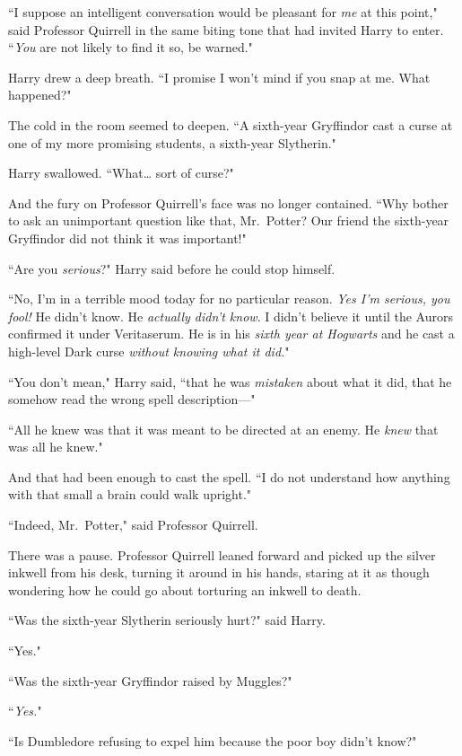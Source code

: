 ``I suppose an intelligent conversation would be pleasant for \emph{me} at this point," said Professor Quirrell in the same biting tone that had invited Harry to enter. ``\emph{You} are not likely to find it so, be warned."

Harry drew a deep breath. ``I promise I won't mind if you snap at me. What happened?"

The cold in the room seemed to deepen. ``A sixth-year Gryffindor cast a curse at one of my more promising students, a sixth-year Slytherin."

Harry swallowed. ``What{\ldots} sort of curse?"

And the fury on Professor Quirrell's face was no longer contained. ``Why bother to ask an unimportant question like that, Mr.~Potter? Our friend the sixth-year Gryffindor did not think it was important!"

``Are you \emph{serious}?" Harry said before he could stop himself.

``No, I'm in a terrible mood today for no particular reason. \emph{Yes I'm serious, you fool!} He didn't know. He \emph{actually didn't know}. I didn't believe it until the Aurors confirmed it under Veritaserum. He is in his \emph{sixth year at Hogwarts} and he cast a high-level Dark curse \emph{without knowing what it did.}"

``You don't mean," Harry said, ``that he was \emph{mistaken} about what it did, that he somehow read the wrong spell description---"

``All he knew was that it was meant to be directed at an enemy. He \emph{knew} that was all he knew."

And that had been enough to cast the spell. ``I do not understand how anything with that small a brain could walk upright."

``Indeed, Mr.~Potter," said Professor Quirrell.

There was a pause. Professor Quirrell leaned forward and picked up the silver inkwell from his desk, turning it around in his hands, staring at it as though wondering how he could go about torturing an inkwell to death.

``Was the sixth-year Slytherin seriously hurt?" said Harry.

``Yes."

``Was the sixth-year Gryffindor raised by Muggles?"

``\emph{Yes.}"

``Is Dumbledore refusing to expel him because the poor boy didn't know?"

